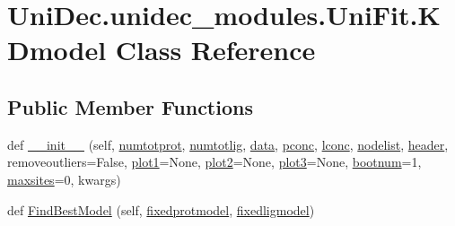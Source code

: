 \hypertarget{class_uni_dec_1_1unidec__modules_1_1_uni_fit_1_1_k_dmodel}{}\section{Uni\+Dec.\+unidec\+\_\+modules.\+Uni\+Fit.\+K\+Dmodel Class Reference}
\label{class_uni_dec_1_1unidec__modules_1_1_uni_fit_1_1_k_dmodel}
\subsection*{Public Member Functions}
\begin{DoxyCompactItemize}
\item 
def \hyperlink{class_uni_dec_1_1unidec__modules_1_1_uni_fit_1_1_k_dmodel_ac6a44a79a7137fd8941a0bc99fbc7ec2}{\+\_\+\+\_\+init\+\_\+\+\_\+} (self, \hyperlink{class_uni_dec_1_1unidec__modules_1_1_uni_fit_1_1_k_dmodel_a113f9a77d43be14a823859d3b26b5c21}{numtotprot}, \hyperlink{class_uni_dec_1_1unidec__modules_1_1_uni_fit_1_1_k_dmodel_a0be297c68426a79312ad1d31a9c9c170}{numtotlig}, \hyperlink{class_uni_dec_1_1unidec__modules_1_1_uni_fit_1_1_k_dmodel_a5ceedc0dd54b86d553b40a2d741b6765}{data}, \hyperlink{namespace_uni_dec_1_1unidec__modules_1_1_uni_fit_aa019b40015da9a7ea7f34a51f432d066}{pconc}, \hyperlink{namespace_uni_dec_1_1unidec__modules_1_1_uni_fit_a86d9ea39b15b86dde182abb7c19e97a6}{lconc}, \hyperlink{namespace_uni_dec_1_1unidec__modules_1_1_uni_fit_a47c1df55ded9e5a7066ef069289b2b43}{nodelist}, \hyperlink{class_uni_dec_1_1unidec__modules_1_1_uni_fit_1_1_k_dmodel_ad358568cc86759b98301505e4269dca5}{header}, removeoutliers=False, \hyperlink{class_uni_dec_1_1unidec__modules_1_1_uni_fit_1_1_k_dmodel_a76d9311b647a92b09eecac9670862afb}{plot1}=None, \hyperlink{class_uni_dec_1_1unidec__modules_1_1_uni_fit_1_1_k_dmodel_ab0856817a2ea9cbb7b380e36526eb228}{plot2}=None, \hyperlink{class_uni_dec_1_1unidec__modules_1_1_uni_fit_1_1_k_dmodel_a89b958e4fd161cde0597e92f91d37917}{plot3}=None, \hyperlink{class_uni_dec_1_1unidec__modules_1_1_uni_fit_1_1_k_dmodel_a6d338faa2ada91c46c115a190d763bae}{bootnum}=1, \hyperlink{class_uni_dec_1_1unidec__modules_1_1_uni_fit_1_1_k_dmodel_abc4d01c70a5db6f1fb92f1ccdab9e180}{maxsites}=0, kwargs)
\item 
def \hyperlink{class_uni_dec_1_1unidec__modules_1_1_uni_fit_1_1_k_dmodel_a8fdde80b49979574531f0f2c34b7f501}{Find\+Best\+Model} (self, \hyperlink{class_uni_dec_1_1unidec__modules_1_1_uni_fit_1_1_k_dmodel_a8e11336c6cc5fedbb05036b5e627c47c}{fixedprotmodel}, \hyperlink{class_uni_dec_1_1unidec__modules_1_1_uni_fit_1_1_k_dmodel_afba96683c5ef61d15b93d86d372620fd}{fixedligmodel})

\end{DoxyCompactItemize}
